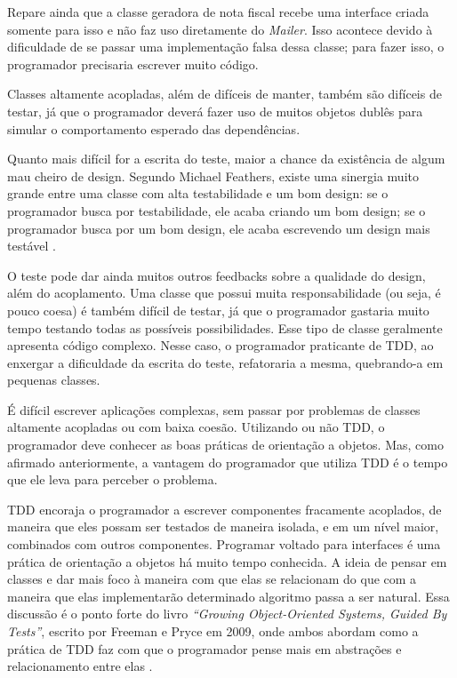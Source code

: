 Repare ainda que a classe geradora de nota fiscal recebe uma interface criada
somente para isso e não faz uso diretamente do \textit{Mailer}. Isso acontece
devido à dificuldade de se passar uma implementação falsa dessa classe; para
fazer isso, o programador precisaria escrever muito código.

Classes altamente acopladas, além de difíceis de manter, também são difíceis de
testar, já que o programador deverá fazer uso de muitos objetos dublês para
simular o comportamento esperado das dependências.

Quanto mais difícil for a escrita do teste, maior a chance da existência de
algum mau cheiro de design. Segundo Michael Feathers, existe uma sinergia muito
grande entre uma classe com alta testabilidade e um bom design: se o
programador busca por testabilidade, ele acaba criando um bom design; se o
programador busca por um bom design, ele acaba escrevendo um design mais
testável \cite{feathers-synergy}.

O teste pode dar ainda muitos outros feedbacks sobre a qualidade do design,
além do acoplamento. Uma classe que possui muita responsabilidade (ou seja, é
pouco coesa) é também difícil de testar, já que o programador gastaria muito
tempo testando todas as possíveis possibilidades. Esse tipo de classe geralmente
apresenta código complexo. Nesse caso, o programador praticante de TDD, ao
enxergar a dificuldade da escrita do teste, refatoraria a mesma, quebrando-a em
pequenas classes.

É difícil escrever aplicações complexas, sem passar por problemas de classes
altamente acopladas ou com baixa coesão. Utilizando ou não TDD, o programador
deve conhecer as boas práticas de orientação a objetos. Mas, como afirmado
anteriormente, a vantagem do programador que utiliza TDD é o tempo que ele leva
para perceber o problema.

TDD encoraja o programador a escrever componentes fracamente acoplados, de
maneira que eles possam ser testados de maneira isolada, e em um nível maior,
combinados com outros componentes.
Programar voltado para interfaces é uma prática de orientação a objetos há muito
tempo conhecida. A ideia de pensar em classes e dar mais foco à maneira com que
elas se relacionam do que com a maneira que elas implementarão determinado
algoritmo passa a ser natural. Essa discussão é o ponto forte do livro
\textit{``Growing Object-Oriented Systems, Guided By Tests''}, escrito por
Freeman e Pryce em 2009, onde ambos abordam como a prática de TDD faz com que
o programador pense mais em abstrações e relacionamento entre elas \cite{GOOS}.

